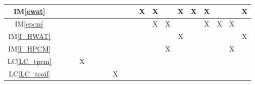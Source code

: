 \documentclass[12pt]{article}
\newcommand{\iref}[1]{IM\ref{#1}}
\newcommand{\lcref}[1]{LC\ref{#1}}
\begin{document}
{\begin{landscape}
\begin{table}[h!]
\begin{tabular}{|c|c|c|c|c|c|c|c|c|c|c|c|c|c|c|c|c|c|c|c|}
        \iref{ewat}         &                            &                 &                &               &                        &                  &                    &                &                 &                   & X               & X                 &                     & X                & X              & X                 &               &                    & X                 \\ \hline
        \iref{epcm}         &                            &                 &                &               &                        &                  &                    &                &                 &                   &                 & X                 & X                   &                  &                & X                 & X             & X                  &                   \\ \hline
        \iref{I_HWAT}       &                            &                 &                &               &                        &                  &                    &                &                 &                   &                 &                   &                     & X                &                &                   &               &                    & X                 \\ \hline
        \iref{I_HPCM}       &                            &                 &                &               &                        &                  &                    &                &                 &                   &                 &                   & X                   &                  &                &                   &               & X                  &                   \\ \hline
        \lcref{LC_tpcm}     &                            &                 &                & X             &                        &                  &                    &                &                 &                   &                 &                   &                     &                  &                &                   &               &                    &                   \\ \hline
        \lcref{LC_tcoil}    &                            &                 &                &               &                        &                  &                    & X              &                 &                   &                 &                   &                     &                  &                &                   &               &                    &                   \\ \hline

\end{tabular}
\end{table}
\end{landscape}}
\end{document}
